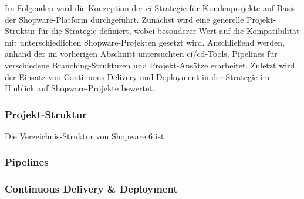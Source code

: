 Im Folgenden wird die Konzeption der \acrshort{ci}-Strategie für Kundenprojekte auf Basis der Shopware-Platform
durchgeführt.
Zunächst wird eine generelle Projekt-Struktur für die Strategie definiert, wobei besonderer Wert auf die
Kompatibilität mit unterschiedlichen Shopware-Projekten gesetzt wird.
Anschließend werden, anhand der im vorherigen Abschnitt untersuchten \acrshort{ci}/\acrshort{cd}-Tools, Pipelines für
verschiedene Branching-Strukturen und Projekt-Ansätze erarbeitet.
Zuletzt wird der Einsatz von Continuous Delivery und Deployment in der Strategie im Hinblick auf Shopware-Projekte
bewertet.

\subsubsection{Projekt-Struktur}


Die Verzeichnis-Struktur von Shopware 6 ist

\subsubsection{Pipelines}


\subsubsection{Continuous Delivery \& Deployment}


\clearpage
